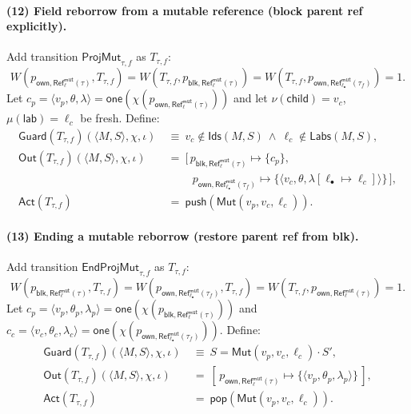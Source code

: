 \documentclass[runningheads]{llncs}
\begin{document}
\paragraph{(12) Field reborrow from a mutable reference (block parent ref explicitly).}
Add transition $\mathsf{ProjMut}_{\tau,f}$ as $T_{\tau,f}$: 
\begin{equation*}
    W(p_{\mathsf{own},\mathsf{Ref}^{\mathsf{mut}}_{\ell}(\tau)},T_{\tau,f})=
    W(T_{\tau,f},p_{\mathsf{blk},\mathsf{Ref}^{\mathsf{mut}}_{\ell}(\tau)})=
    W(T_{\tau,f},p_{\mathsf{own},\mathsf{Ref}^{\mathsf{mut}}_{\ell_{\bullet}}(\tau_f)})=1.
\end{equation*}
Let $c_p=\langle v_p,\theta,\lambda\rangle=\mathsf{one}(\chi(p_{\mathsf{own},\mathsf{Ref}^{\mathsf{mut}}_{\ell}(\tau)}))$
and let $\nu(\mathsf{child})=v_c$, $\mu(\mathsf{lab})=\ell_c$ be fresh. Define:
\begin{align*}
\mathsf{Guard}(T_{\tau,f})(\langle M,S\rangle,\chi,\iota)
&~\equiv~ v_c\notin \mathsf{Ids}(M,S)\ \wedge\ \ell_c\notin \mathsf{Labs}(M,S),\\
\mathsf{Out}(T_{\tau,f})(\langle M,S\rangle,\chi,\iota)
&~=~ [\,p_{\mathsf{blk},\mathsf{Ref}^{\mathsf{mut}}_{\ell}(\tau)}\mapsto \{c_p\},\\
&\qquad\ \ p_{\mathsf{own},\mathsf{Ref}^{\mathsf{mut}}_{\ell_{\bullet}}(\tau_f)}\mapsto
      \{\langle v_c,\theta,\lambda[\ell_{\bullet}\mapsto \ell_c]\rangle\}\,],\\
\mathsf{Act}(T_{\tau,f})
&~=~ \mathsf{push}(\mathsf{Mut}(v_p,v_c,\ell_c)).
\end{align*}

\paragraph{(13) Ending a mutable reborrow (restore parent ref from blk).}
Add transition $\mathsf{EndProjMut}_{\tau,f}$ as $T_{\tau,f}$:
\begin{equation*}
    W(p_{\mathsf{blk},\mathsf{Ref}^{\mathsf{mut}}_{\ell}(\tau)},T_{\tau,f})=
    W(p_{\mathsf{own},\mathsf{Ref}^{\mathsf{mut}}_{\ell_{\bullet}}(\tau_f)},T_{\tau,f})=
    W(T_{\tau,f},p_{\mathsf{own},\mathsf{Ref}^{\mathsf{mut}}_{\ell}(\tau)})=1.
\end{equation*}
Let $c_p=\langle v_p,\theta_p,\lambda_p\rangle=\mathsf{one}(\chi(p_{\mathsf{blk},\mathsf{Ref}^{\mathsf{mut}}_{\ell}(\tau)}))$ and
$c_c=\langle v_c,\theta_c,\lambda_c\rangle=\mathsf{one}(\chi(p_{\mathsf{own},\mathsf{Ref}^{\mathsf{mut}}_{\ell_{\bullet}}(\tau_f)}))$.
Define:
\begin{align*}
\mathsf{Guard}(T_{\tau,f})(\langle M,S\rangle,\chi,\iota)
&~\equiv~ S=\mathsf{Mut}(v_p,v_c,\ell_c)\cdot S',\\
\mathsf{Out}(T_{\tau,f})(\langle M,S\rangle,\chi,\iota)
&~=~ [\,p_{\mathsf{own},\mathsf{Ref}^{\mathsf{mut}}_{\ell}(\tau)}\mapsto \{\langle v_p,\theta_p,\lambda_p\rangle\}\,],\\
\mathsf{Act}(T_{\tau,f})
&~=~ \mathsf{pop}(\mathsf{Mut}(v_p,v_c,\ell_c)).
\end{align*}
\end{document}
